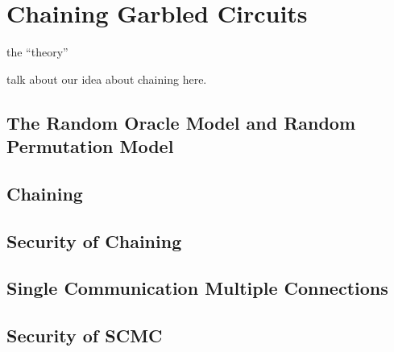 \chapter{Chaining Garbled Circuits}

the ``theory''

talk about our idea about chaining here.

\section{The Random Oracle Model and Random Permutation Model}
\section{Chaining}
\section{Security of Chaining}
\section{Single Communication Multiple Connections}
\section{Security of SCMC}
